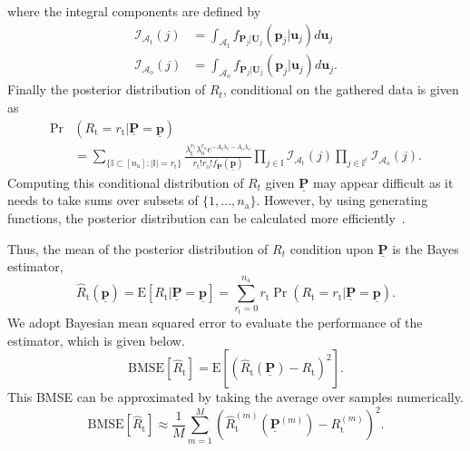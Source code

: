 where the integral components are defined by
\begin{align} \label{equation:IntegralComponentsT}
\mathcal{I}_{\mathcal{A}_{\mathrm{t}}}(j)
&= \int_{\mathcal{A}_{\mathrm{t}}} f_{\mathbf{P}_j|\mathbf{U}_j}
(\mathbf{p}_j|\mathbf{u}_j) d\mathbf{u}_j \\
\label{equation:IntegralComponentsO}
\mathcal{I}_{\mathcal{A}_{\mathrm{o}}}(j)
&= \int_{\mathcal{A}_{\mathrm{o}}} f_{\mathbf{P}_j|\mathbf{U}_j}
(\mathbf{p}_j|\mathbf{u}_j) d\mathbf{u}_j .
\end{align}
Finally the posterior distribution of $R_{t}$, conditional on the gathered data is given as
\begin{equation*}
\begin{split}
	\Pr & \left( R_{\mathrm{t}} = r_{\mathrm{t}}
	| \underline{\mathbf{P}} = \underline{\mathbf{p}} \right) \\
	&= \sum_{\{ \mathbb{I} \subset [n_{\mathrm{a}}]
		: |\mathbb{I}| = r_{\mathrm{t}} \}}
	\frac{\lambda_{\mathrm{t}}^{r_{\mathrm{t}}}
		\lambda_{\mathrm{o}}^{r_{\mathrm{o}}}
		e^{- A_{\mathrm{t}} \lambda_{\mathrm{t}}
			- A_{\mathrm{o}} \lambda_{\mathrm{o}}}}
	{r_{\mathrm{t}}! r_{\mathrm{o}}!
		f_{\underline{\mathbf{P}}}(\underline{\mathbf{p}})}
	\prod_{j \in \mathbb{I}} \mathcal{I}_{\mathcal{A}_{\mathrm{t}}}(j)
	\prod_{j \in \mathbb{I}^{\mathrm{c}}} \mathcal{I}_{\mathcal{A}_{\mathrm{o}}}(j) .
\end{split}
\end{equation*}
Computing this conditional distribution of $R_{t}$ given $\underline{\mathbf{P}}$ may appear difficult as it needs to take sums over subsets of $\{ 1, \ldots, n_{\mathrm{a}} \}$. However, by using generating functions, the posterior distribution can be calculated more efficiently~\cite{graham1994concrete}.

Thus, the mean of the posterior distribution of $R_{t}$ condition upon $\underline{\mathbf{P}}$ is the Bayes estimator,
\begin{equation} \label{equation:MMSE}
\hat{R}_{\mathrm{t}} \left( \underline{\mathbf{p}} \right)
= \mathrm{E} \left[ R_{\mathrm{t}}
| \underline{\mathbf{P}} = \underline{\mathbf{p}} \right]
= \sum_{r_{\mathrm{t}} = 0}^{n_{\mathrm{a}}} r_{\mathrm{t}}
\Pr \left( R_{\mathrm{t}} = r_{\mathrm{t}}
| \underline{\mathbf{P}} = \underline{\mathbf{p}} \right)  .
\end{equation}
We adopt Bayesian mean squared error to evaluate the performance of the estimator, which is given below.
\begin{equation} \label{equation:BMSE}
\mathrm{BMSE} \left[ \hat{R}_{\mathrm{t}} \right]
= \mathrm{E} \left[ \left(
\hat{R}_{\mathrm{t}} \left( \underline{\mathbf{P}} \right)
- R_{\mathrm{t}} \right)^2 \right] .
\end{equation}
This BMSE can be approximated by taking the average over samples numerically.
\begin{equation} \label{equation:EmpiricalBMSE}
\mathrm{BMSE} \left[ \hat{R}_{\mathrm{t}} \right]
\approx \frac{1}{M} \sum_{m=1}^M \left(
\hat{R}_{\mathrm{t}}^{(m)} \left( \underline{\mathbf{P}}^{(m)} \right)
- R_{\mathrm{t}}^{(m)} \right)^2 .
\end{equation}


